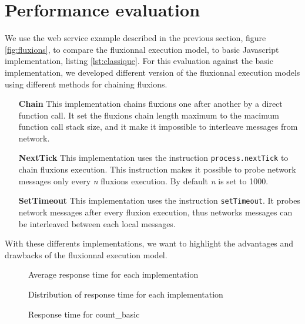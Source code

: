 \section{Performance evaluation}

We use the web service example described in the previous section, figure \ref{fig:fluxions}, to compare the fluxionnal execution model, to basic Javascript implementation, listing \ref{lst:classique}.
For this evaluation against the basic implementation, we developed different version of the fluxionnal execution models using different methods for chaining fluxions.

\begin{itemize}
	\item[\textbf{Chain}]
		This implementation chains fluxions one after another by a direct function call.
		It set the fluxions chain length maximum to the macimum function call stack size, and it make it impossible to interleave messages from network.

	\item[\textbf{NextTick}]
		This implementation uses the instruction \texttt{process.nextTick} to chain fluxions execution.
		This instruction makes it possible to probe network messages only every \textit{n} fluxions execution. By default \textit{n} is set to 1000.

	\item[\textbf{SetTimeout}]
		This implementation uses the instruction \texttt{setTimeout}.
		It probes network messages after every fluxion execution, thus networks messages can be interleaved between each local messages.
\end{itemize}

With these differents implementations, we want to highlight the advantages and drawbacks of the fluxionnal execution model.

\begin{figure}

\caption{Average response time for each implementation}
\label{fig:reponsetime}
\end{figure}

\begin{figure}

\caption{Distribution of response time for each implementation}
\label{fig:distribution}
\end{figure}

\begin{figure}

\caption{Response time for count\_basic}
\label{fig:timecountbasic}
\end{figure}

